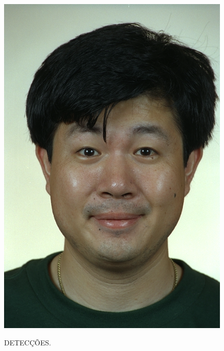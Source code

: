 \begin{figure}[h!]
    \caption{DETECÇÕES.}
    \centering
    \begin{minipage}[b]{0.33\textwidth}
        \centering
        \includegraphics[width=0.9\linewidth]{fig/01_example_image.png}
        \label{fig:imagem}
    \end{minipage}\hfill\begin{minipage}[b]{0.33\textwidth}
        \centering

\end{minipage}
\end{figure}
